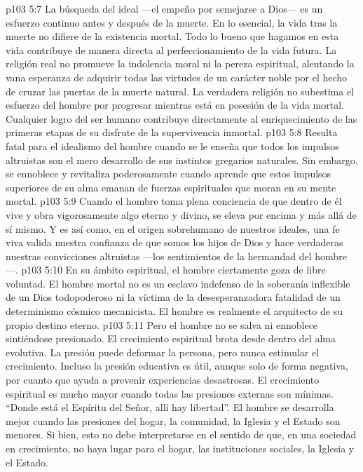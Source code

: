 \vs p103 5:7 \pc La búsqueda del ideal ---el empeño por semejarse a Dios--- es un esfuerzo continuo antes y después de la muerte. En lo esencial, la vida tras la muerte no difiere de la existencia mortal. Todo lo bueno que hagamos en esta vida contribuye de manera directa al perfeccionamiento de la vida futura. La religión real no promueve la indolencia moral ni la pereza espiritual, alentando la vana esperanza de adquirir todas las virtudes de un carácter noble por el hecho de cruzar las puertas de la muerte natural. La verdadera religión no subestima el esfuerzo del hombre por progresar mientras está en posesión de la vida mortal. Cualquier logro del ser humano contribuye directamente al enriquecimiento de las primeras etapas de su disfrute de la supervivencia inmortal.
\vs p103 5:8 \pc Resulta fatal para el idealismo del hombre cuando se le enseña que todos los impulsos altruistas son el mero desarrollo de sus instintos gregarios naturales. Sin embargo, se ennoblece y revitaliza poderosamente cuando aprende que estos impulsos superiores de su alma emanan de fuerzas espirituales que moran en su mente mortal.
\vs p103 5:9 Cuando el hombre toma plena conciencia de que dentro de él vive y obra vigorosamente algo eterno y divino, se eleva por encima y más allá de sí mismo. Y es así como, en el origen sobrehumano de nuestros ideales, una fe viva valida nuestra confianza de que somos los hijos de Dios y hace verdaderas nuestras convicciones altruistas ---los sentimientos de la hermandad del hombre---.
\vs p103 5:10 En su ámbito espiritual, el hombre ciertamente goza de libre voluntad. El hombre mortal no es un esclavo indefenso de la soberanía inflexible de un Dios todopoderoso ni la víctima de la desesperanzadora fatalidad de un determinismo cósmico mecanicista. El hombre es realmente el arquitecto de su propio destino eterno.
\vs p103 5:11 \pc Pero el hombre no se salva ni ennoblece sintiéndose presionado. El crecimiento espiritual brota desde dentro del alma evolutiva. La presión puede deformar la persona, pero nunca estimular el crecimiento. Incluso la presión educativa es útil, aunque solo de forma negativa, por cuanto que ayuda a prevenir experiencias desastrosas. El crecimiento espiritual es mucho mayor cuando todas las presiones externas son mínimas. “Donde está el Espíritu del Señor, allí hay libertad”. El hombre se desarrolla mejor cuando las presiones del hogar, la comunidad, la Iglesia y el Estado son menores. Si bien, esto no debe interpretarse en el sentido de que, en una sociedad en crecimiento, no haya lugar para el hogar, las instituciones sociales, la Iglesia y el Estado.
